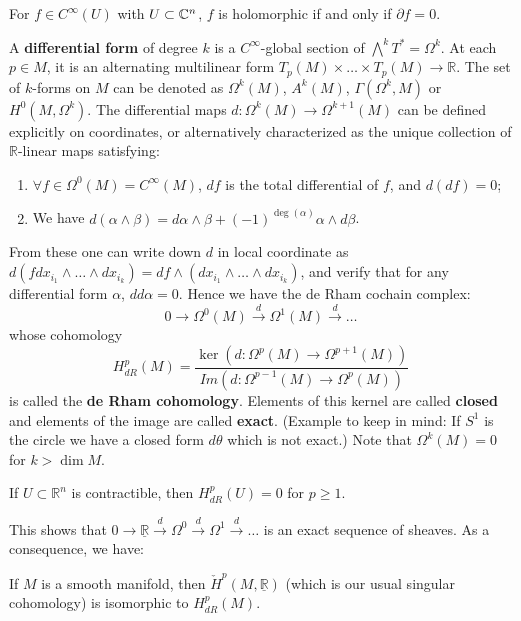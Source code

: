 \begin{theorem}
For $f\in C^\infty(U)$ with $U\subset {\mathbb C}^n$, $f$ is holomorphic if and only if $\partial f=0$. 
\end{theorem}

A \textbf{differential form} of degree $k$ is a $C^\infty$-global section of $\bigwedge^kT^*=\Omega^k$. At each $p\in M$, it is an alternating multilinear form $T_p(M)\times\dots\times T_p(M)\rightarrow \mathbb{R}$. The set of $k$-forms on $M$ can be denoted as $\Omega^k(M)$, $A^k(M)$, $\Gamma(\Omega^k, M)$ or $H^0(M,\Omega^k)$. The differential maps $d:\Omega^k(M)\rightarrow\Omega^{k+1}(M)$ can be defined explicitly on coordinates, or alternatively characterized as the unique collection of $\mathbb{R}$-linear maps satisfying: 
\begin{enumerate}
\item $\forall f\in\Omega^0(M)=C^\infty(M)$, $df$ is the total differential of $f$, and $d(df)=0$;
\item We have $d(\alpha\wedge\beta)=d\alpha\wedge\beta+(-1)^{\deg(\alpha)}\alpha\wedge d\beta$.
\end{enumerate}


From these one can write down $d$ in local coordinate as $d(f dx_{i_1}\wedge\dots\wedge dx_{i_k})=df\wedge(dx_{i_1}\wedge\dots\wedge dx_{i_k})$, and verify that for any differential form $\alpha$, $dd\alpha=0$. Hence we have the de Rham cochain complex:
$$0\rightarrow\Omega^0(M)\xrightarrow{d}\Omega^1(M)\xrightarrow{d}\dots$$
whose cohomology 
$$H^p_{dR}(M)=\frac{\ker(d:\Omega^p(M)\to \Omega^{p+1}(M))}{Im(d:\Omega^{p-1}(M)\to \Omega^p(M))}$$ 
is called the \textbf{de Rham cohomology}. Elements of this kernel are called \textbf{closed} and elements of the image are called \textbf{exact}. (Example to keep in mind: If $S^1$ is the circle we have a closed form $d\theta$ which is not exact.) 
Note that $\Omega^k(M)=0$ for $k>\dim M$.  

\begin{lemma} If $U\subset\mathbb{R}^n$ is contractible, then $H^p_{dR}(U)=0$ for $p\geq 1$.
\end{lemma}
	
This shows that $0\rightarrow\underline{\mathbb{R}}\xrightarrow{d}\Omega^0\xrightarrow{d}\Omega^1\xrightarrow{d}\dots$ is an exact sequence of sheaves. As a consequence, we have:
\begin{theorem}
	If $M$ is a smooth manifold, then $\check{H}^p(M,\underline{\mathbb{R}})$ (which is our usual singular cohomology) is isomorphic to $H^p_{dR}(M)$. 
\end{theorem}

